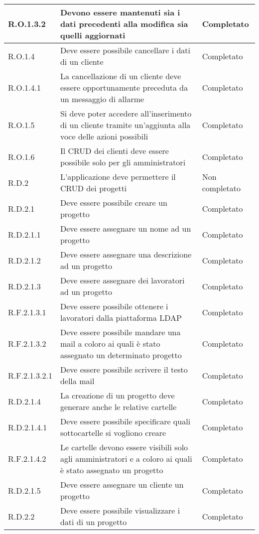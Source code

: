 \begin{longtable}{p{} p{} p{}}
\hline
R.O.1.3.2  & Devono essere mantenuti sia i dati precedenti alla modifica sia quelli aggiornati & Completato \\
\hline
R.O.1.4  & Deve essere possibile cancellare i dati di un cliente & Completato \\
\hline
R.O.1.4.1  & La cancellazione di un cliente deve essere opportunamente preceduta da un messaggio di allarme & Completato \\
\hline
R.O.1.5  & Si deve poter accedere all'inserimento di un cliente tramite un'aggiunta alla voce delle azioni possibili & Completato \\
\hline
R.O.1.6    & Il CRUD dei clienti deve essere possibile solo per gli amministratori & Completato \\
\hline
R.D.2    & L'applicazione deve permettere il CRUD dei progetti & Non completato \\
\hline
R.D.2.1    & Deve essere possibile creare un progetto & Completato \\
\hline
R.D.2.1.1    & Deve essere assegnare un nome ad un progetto & Completato \\
\hline
R.D.2.1.2    & Deve essere assegnare una descrizione ad un progetto & Completato \\
\hline
R.D.2.1.3    & Deve essere assegnare dei lavoratori ad un progetto & Completato \\
\hline
R.F.2.1.3.1    & Deve essere possibile ottenere i lavoratori dalla piattaforma LDAP & Completato \\
\hline
R.F.2.1.3.2   & Deve essere possibile mandare una mail a coloro ai quali è stato assegnato un determinato progetto & Completato \\
\hline
R.F.2.1.3.2.1   & Deve essere possibile scrivere il testo della mail & Completato \\
\hline
R.D.2.1.4  & La creazione di un progetto deve generare anche le relative cartelle & Completato \\
\hline
R.D.2.1.4.1  & Deve essere possibile specificare quali sottocartelle si vogliono creare & Completato \\
\hline
R.F.2.1.4.2  & Le cartelle devono essere visibili solo agli amministratori e a coloro ai quali è stato assegnato un progetto & Completato \\
\hline
R.D.2.1.5  & Deve essere assegnare un cliente un progetto & Completato \\
\hline
R.D.2.2    & Deve essere possibile visualizzare i dati di un progetto &Completato \\

\end{longtable}
